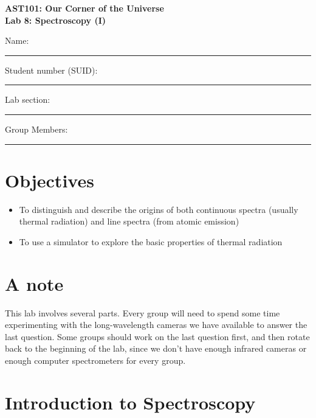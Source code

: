 \documentclass[11pt]{article}
\begin{document}
\begin{center}
\textbf{\Large
AST101: Our Corner of the Universe \\
\vspace*{0.1cm}
Lab 8: Spectroscopy (I)
}
\end{center}

\vspace*{0.5cm}

{\Large Name:}\vspace*{0.5cm}\\\hrule
{\Large Student number (SUID):}\vspace*{0.5cm}\\\hrule
{\Large Lab section:}\vspace*{0.5cm}\\\hrule
{\Large Group Members:}\vspace*{0.5cm}\\\hrule
\vspace*{0.5cm}


\section{Objectives}
\begin{itemize}
	\item To distinguish and describe the origins of both continuous spectra (usually thermal radiation) and line spectra (from atomic emission)
	\item To use a simulator to explore the basic properties of thermal radiation
\end{itemize}

\section{A note}
This lab involves several parts. Every group will need to spend some time experimenting with the long-wavelength cameras we have available to answer the last question. Some groups should work on the last question first, and then rotate back to the beginning of the lab, since we don't have enough infrared cameras or enough computer spectrometers for every group.

\section{Introduction to Spectroscopy}
\end{document}
